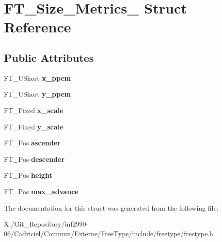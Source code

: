 \hypertarget{struct_f_t___size___metrics__}{\section{F\-T\-\_\-\-Size\-\_\-\-Metrics\-\_\- Struct Reference}
\label{struct_f_t___size___metrics__}
}
\subsection*{Public Attributes}
\begin{DoxyCompactItemize}
\item 
\hypertarget{struct_f_t___size___metrics___abb42b175a3450e9d8b84483f166d6c8a}{F\-T\-\_\-\-U\-Short {\bfseries x\-\_\-ppem}}\label{struct_f_t___size___metrics___abb42b175a3450e9d8b84483f166d6c8a}

\item 
\hypertarget{struct_f_t___size___metrics___abcdb70cb9e39a74679bc39c07f3275f7}{F\-T\-\_\-\-U\-Short {\bfseries y\-\_\-ppem}}\label{struct_f_t___size___metrics___abcdb70cb9e39a74679bc39c07f3275f7}

\item 
\hypertarget{struct_f_t___size___metrics___a5e92028bb9881e107a6fb75d557eaff1}{F\-T\-\_\-\-Fixed {\bfseries x\-\_\-scale}}\label{struct_f_t___size___metrics___a5e92028bb9881e107a6fb75d557eaff1}

\item 
\hypertarget{struct_f_t___size___metrics___a1f8b1cb3538b9920127f721dd061379d}{F\-T\-\_\-\-Fixed {\bfseries y\-\_\-scale}}\label{struct_f_t___size___metrics___a1f8b1cb3538b9920127f721dd061379d}

\item 
\hypertarget{struct_f_t___size___metrics___ab5fde60a2661d7b774f61c264a2a6070}{F\-T\-\_\-\-Pos {\bfseries ascender}}\label{struct_f_t___size___metrics___ab5fde60a2661d7b774f61c264a2a6070}

\item 
\hypertarget{struct_f_t___size___metrics___a9b2ca3a4391803e8721ed99eb9953d52}{F\-T\-\_\-\-Pos {\bfseries descender}}\label{struct_f_t___size___metrics___a9b2ca3a4391803e8721ed99eb9953d52}

\item 
\hypertarget{struct_f_t___size___metrics___ae3361e264fb8a9e669f118bdb244439b}{F\-T\-\_\-\-Pos {\bfseries height}}\label{struct_f_t___size___metrics___ae3361e264fb8a9e669f118bdb244439b}

\item 
\hypertarget{struct_f_t___size___metrics___ac315a7a834ac1a57c7169ce021718958}{F\-T\-\_\-\-Pos {\bfseries max\-\_\-advance}}\label{struct_f_t___size___metrics___ac315a7a834ac1a57c7169ce021718958}

\end{DoxyCompactItemize}


The documentation for this struct was generated from the following file\-:\begin{DoxyCompactItemize}
\item 
X\-:/\-Git\-\_\-\-Repository/inf2990-\/06/\-Cadriciel/\-Commun/\-Externe/\-Free\-Type/include/freetype/freetype.\-h\end{DoxyCompactItemize}
